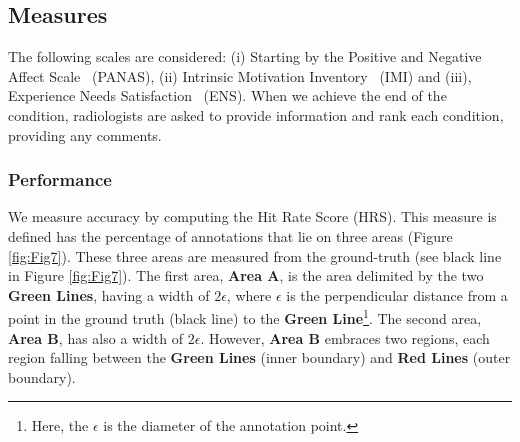 \documentclass{chi-ext}
\begin{document}

\subsection{Measures}

The following scales are considered: (i) Starting by the Positive and Negative Affect Scale~\cite{watson1999panas} (PANAS), (ii) Intrinsic Motivation Inventory~\cite{ryan1982control} (IMI) and (iii), Experience Needs Satisfaction~\cite{broeck2010capturing} (ENS). When we achieve the end of the condition, radiologists are asked to provide information and rank each condition, providing any comments.

\subsubsection{Performance}

We measure accuracy by computing the Hit Rate Score (HRS). This measure is defined has the percentage of annotations that lie on three areas (Figure \ref{fig:Fig7}). These three areas are measured from the ground-truth (see black line in Figure \ref{fig:Fig7}). The first area, \textbf{Area A}, is the area delimited by the two \textbf{Green Lines}, having a width of $2\epsilon$, where $\epsilon$ is the perpendicular distance from a point in the ground truth (black line) to the \textbf{Green Line}\footnote{Here, the $\epsilon$ is the diameter of the annotation point.}. The second area, \textbf{Area B}, has also a width of $2\epsilon$. However,  \textbf{Area B} embraces two regions, each region falling between the \textbf{Green Lines} (inner boundary) and \textbf{Red Lines} (outer boundary).
\end{document}
